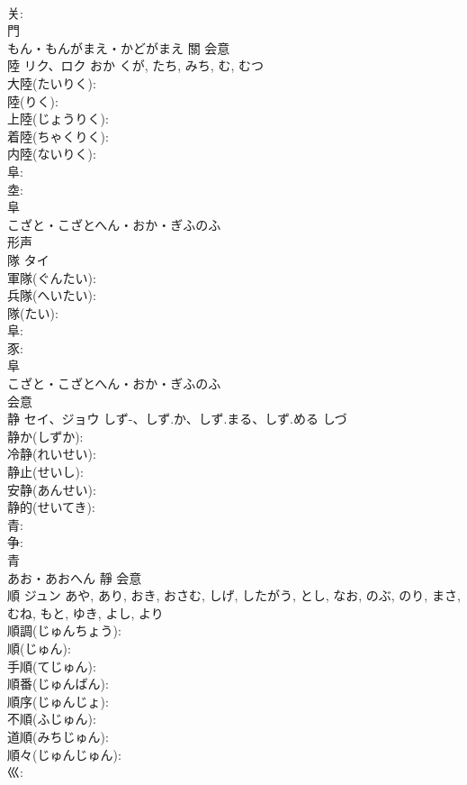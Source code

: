 \documentclass[8pt]{extreport}
\begin{document}
\begin{CJK}{UTF8}{min}
\\	关: 
\\	門	
\\	もん・もんがまえ・かどがまえ	關	会意 
\\	陸	リク、ロク	おか	くが, たち, みち, む, むつ	
\\	大陸(たいりく): 
\\	陸(りく): 
\\	上陸(じょうりく): 
\\	着陸(ちゃくりく): 
\\	内陸(ないりく): 
\\	阜: 
\\	坴: 
\\	阜	
\\	こざと・こざとへん・おか・ぎふのふ	
\\	形声 
\\	隊	タイ			
\\	軍隊(ぐんたい): 
\\	兵隊(へいたい): 
\\	隊(たい): 
\\	阜: 
\\	豕: 
\\	阜	
\\	こざと・こざとへん・おか・ぎふのふ	
\\	会意 
\\	静	セイ、ジョウ	しず-、しず.か、しず.まる、しず.める	しづ	
\\	静か(しずか): 
\\	冷静(れいせい): 
\\	静止(せいし): 
\\	安静(あんせい): 
\\	静的(せいてき): 
\\	青: 
\\	争: 
\\	青	
\\	あお・あおへん	靜	会意 
\\	順	ジュン		あや, あり, おき, おさむ, しげ, したがう, とし, なお, のぶ, のり, まさ, むね, もと, ゆき, よし, より	
\\	順調(じゅんちょう): 
\\	順(じゅん): 
\\	手順(てじゅん): 
\\	順番(じゅんばん): 
\\	順序(じゅんじょ): 
\\	不順(ふじゅん): 
\\	道順(みちじゅん): 
\\	順々(じゅんじゅん): 
\\	巛: 

\end{CJK}
\end{document}
